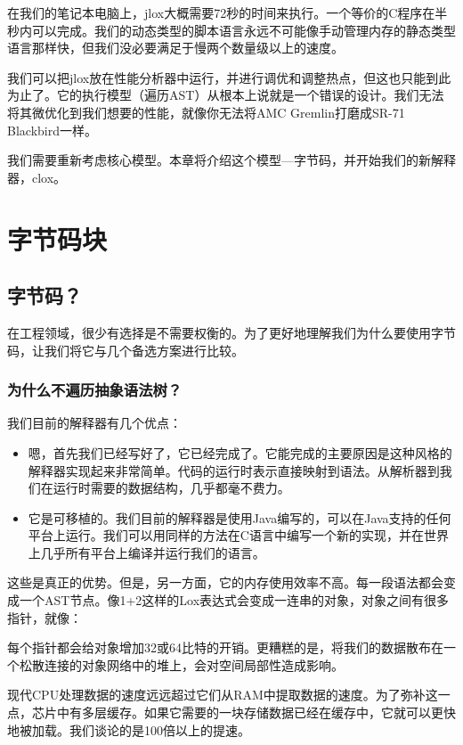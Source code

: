 \documentclass[cn,11pt,chinese]{elegantbook}
\begin{document}
在我们的笔记本电脑上，jlox大概需要72秒的时间来执行。一个等价的C程序在半秒内可以完成。我们的动态类型的脚本语言永远不可能像手动管理内存的静态类型语言那样快，但我们没必要满足于慢两个数量级以上的速度。

我们可以把jlox放在性能分析器中运行，并进行调优和调整热点，但这也只能到此为止了。它的执行模型（遍历AST）从根本上说就是一个错误的设计。我们无法将其微优化到我们想要的性能，就像你无法将AMC Gremlin打磨成SR-71 Blackbird一样。

我们需要重新考虑核心模型。本章将介绍这个模型—字节码，并开始我们的新解释器，clox。

\chapter{字节码块}

\section{字节码？}

在工程领域，很少有选择是不需要权衡的。为了更好地理解我们为什么要使用字节码，让我们将它与几个备选方案进行比较。

\subsection{为什么不遍历抽象语法树？}

我们目前的解释器有几个优点：

\begin{itemize}
  \item 嗯，首先我们已经写好了，它已经完成了。它能完成的主要原因是这种风格的解释器实现起来非常简单。代码的运行时表示直接映射到语法。从解析器到我们在运行时需要的数据结构，几乎都毫不费力。
  \item 它是可移植的。我们目前的解释器是使用Java编写的，可以在Java支持的任何平台上运行。我们可以用同样的方法在C语言中编写一个新的实现，并在世界上几乎所有平台上编译并运行我们的语言。
\end{itemize}

这些是真正的优势。但是，另一方面，它的内存使用效率不高。每一段语法都会变成一个AST节点。像1+2这样的Lox表达式会变成一连串的对象，对象之间有很多指针，就像：

每个指针都会给对象增加32或64比特的开销。更糟糕的是，将我们的数据散布在一个松散连接的对象网络中的堆上，会对空间局部性造成影响。

现代CPU处理数据的速度远远超过它们从RAM中提取数据的速度。为了弥补这一点，芯片中有多层缓存。如果它需要的一块存储数据已经在缓存中，它就可以更快地被加载。我们谈论的是100倍以上的提速。
\end{document}
